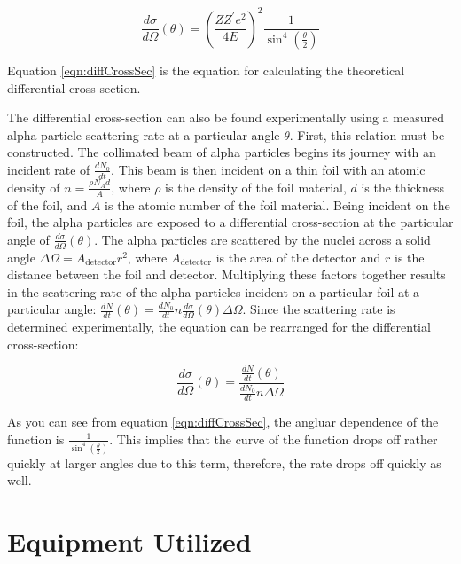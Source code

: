 \documentclass[a4paper]{article}
\begin{document}
\begin{equation}
  \frac{d\sigma}{d\Omega} (\theta) = \left( \frac{Z Z^{\prime} e^2}{4 E}
  \right)^2 \frac{1}{\sin^4 \left( \frac{\theta}{2} \right)}
\end{equation}
\label{eqn:diffCrossSec}

Equation \ref{eqn:diffCrossSec} is the equation for calculating the
theoretical differential cross-section.

\qq The differential cross-section can also be found experimentally using a measured alpha particle scattering rate at a particular angle \( \theta \). First,
this relation must be constructed. The collimated beam of alpha particles begins
its journey with an incident rate of \( \frac{dN_0}{dt} \). This beam is then
incident on a thin foil with an atomic density of
\( n = \frac{\rho N_A d}{A} \), where \( \rho \) is the density of the foil
material, \( d \) is the thickness of the foil, and \( A \) is the atomic number
of the foil material. Being incident on the foil, the alpha particles are
exposed to a differential cross-section at the particular angle of
\( \frac{d\sigma}{d\Omega} (\theta) \). The alpha particles are scattered by the
nuclei across a solid angle \( \Delta \Omega = {A_{\text{detector}}}{r^2} \),
where \( A_{\text{detector}} \) is the area of the detector and \( r \) is the
distance between the foil and detector. Multiplying these factors together
results in the scattering rate of the alpha particles incident on a particular
foil at a particular angle: \( \frac{dN}{dt} (\theta) = \frac{dN_0}{dt} n
\frac{d\sigma}{d\Omega} (\theta) \Delta \Omega \). Since the scattering rate is
determined experimentally, the equation can be rearranged for the differential
cross-section:

\begin{equation}
  \frac{d\sigma}{d\Omega} (\theta) = \frac{\frac{dN}{dt}
    (\theta)}{\frac{dN_0}{dt} n \Delta \Omega}
\end{equation}
\label{eqn:expDiffCrossSec}


\qq As you can see from equation \ref{eqn:diffCrossSec}, the angluar
dependence of the function is $\frac{1}{\sin^4 \left( \frac{\theta}{2}
  \right)}$. This implies that the curve of the function drops off
rather quickly at larger angles due to this term, therefore, the rate
drops off quickly as well.

\section{Equipment Utilized}
\end{document}
